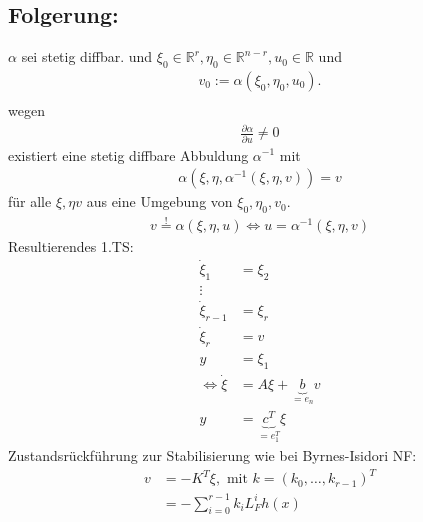 \documentclass[ngerman]{tudscrreprt}
\begin{document}
\subsection*{Folgerung: } $\alpha$ sei stetig diffbar. und $\xi_0 \in \mathbb{R}^r, \eta_0\in\mathbb{R}^{n-r}, u_0 \in \mathbb{R}$ und \begin{align*}
v_0 := \alpha(\xi_0, \eta_0 , u_0). \\ 
\end{align*}
wegen \begin{align*} \frac{\partial \alpha}{\partial u}\ne 0\end{align*}
existiert eine stetig diffbare Abbuldung $\alpha^{-1}$ mit \begin{align*}
\alpha(\xi, \eta, \alpha^{-1}(\xi, \eta, v)) = v
\end{align*}
für alle $\xi, \eta v $ aus eine Umgebung von $\xi_0, \eta_0, v_0.$
\begin{align*}
v \overset{!}{=}\alpha(\xi, \eta, u) \iff u = \alpha^{-1}(\xi, \eta, v)
\end{align*}
Resultierendes 1.TS: \begin{align*}
\dot \xi_1 &= \xi_2\\ 
\vdots\\ 
\dot\xi_{r-1}&= \xi_r\\ 
\dot \xi_r &= v\\ 
y&= \xi_1\\
\iff \dot \xi &= A\xi + \underbrace{b}_{=e_n} v\\ 
y&= \underbrace{c^T}_{= e_1^T} \xi
\end{align*}
Zustandsrückführung zur Stabilisierung wie bei Byrnes-Isidori NF: 
\begin{align*}
v &= - K^T\xi, \text{ mit } k = (k_0, \dots, k_{r-1})^T\\ 
&= -\sum\limits_{i=0}^{r-1} k_i L_F^i h(x)
\end{align*}
\end{document}
